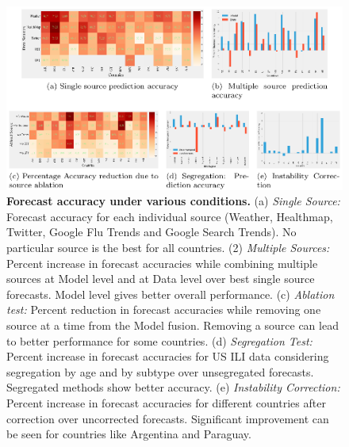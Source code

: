 \documentclass[10pt,letterpaper]{article}
\begin{document}
\begin{figure}[t]
  \centering
  \includegraphics[width=0.96\linewidth]{./figs/perf_figs.eps}

  \caption{\textbf{Forecast accuracy under various conditions.}
  (a) \textit{Single Source:}
  Forecast accuracy for each individual source (Weather, Healthmap, 
  Twitter, Google Flu Trends and Google Search Trends). No particular 
  source is the best for all countries.
  (2) \textit{Multiple Sources:}
  Percent increase in forecast accuracies while combining multiple sources at 
  Model level and at Data level over best single source forecasts.
  Model level gives better overall performance.
  (c) \textit{Ablation test:}
  Percent reduction in forecast accuracies while 
  removing one source at a time from the Model fusion. 
  Removing a source can lead to better performance for some
  countries.
  (d) \textit{Segregation Test:}
  Percent increase in forecast accuracies for US ILI data considering 
  segregation by age and by subtype over unsegregated forecasts.
  Segregated methods show better accuracy.
  (e) \textit{Instability Correction:}
  Percent increase in forecast accuracies
  for different countries after correction over uncorrected forecasts.
  Significant improvement can be seen for countries like Argentina and 
  Paraguay.
  \label{fig2}
  }
\end{figure}
\end{document}
